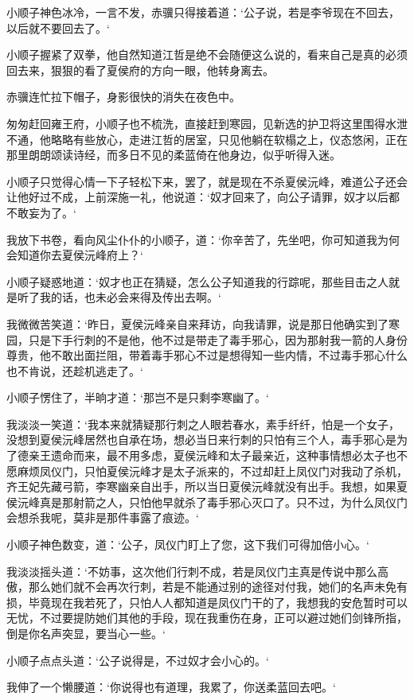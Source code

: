 小顺子神色冰冷，一言不发，赤骥只得接着道：‘公子说，若是李爷现在不回去，以后就不要回去了。‘

小顺子握紧了双拳，他自然知道江哲是绝不会随便这么说的，看来自己是真的必须回去来，狠狠的看了夏侯府的方向一眼，他转身离去。

赤骥连忙拉下帽子，身影很快的消失在夜色中。

匆匆赶回雍王府，小顺子也不梳洗，直接赶到寒园，见新选的护卫将这里围得水泄不通，他略略有些放心，走进江哲的居室，只见他躺在软榻之上，仪态悠闲，正在那里朗朗颂读诗经，而多日不见的柔蓝倚在他身边，似乎听得入迷。

小顺子只觉得心情一下子轻松下来，罢了，就是现在不杀夏侯沅峰，难道公子还会让他好过不成，上前深施一礼，他说道：‘奴才回来了，向公子请罪，奴才以后都不敢妄为了。‘

我放下书卷，看向风尘仆仆的小顺子，道：‘你辛苦了，先坐吧，你可知道我为何会知道你去夏侯沅峰府上？‘

小顺子疑惑地道：‘奴才也正在猜疑，怎么公子知道我的行踪呢，那些目击之人就是听了我的话，也未必会来得及传出去啊。‘

我微微苦笑道：‘昨日，夏侯沅峰亲自来拜访，向我请罪，说是那日他确实到了寒园，只是下手行刺的不是他，他不过是带走了毒手邪心，因为那射我一箭的人身份尊贵，他不敢出面拦阻，带着毒手邪心不过是想得知一些内情，不过毒手邪心什么也不肯说，还趁机逃走了。‘

小顺子愣住了，半晌才道：‘那岂不是只剩李寒幽了。‘

我淡淡一笑道：‘我本来就猜疑那行刺之人眼若春水，素手纤纤，怕是一个女子，没想到夏侯沅峰居然也自承在场，想必当日来行刺的只怕有三个人，毒手邪心是为了德亲王遗命而来，最不用多虑，夏侯沅峰和太子最亲近，这种事情想必太子也不愿麻烦凤仪门，只怕夏侯沅峰才是太子派来的，不过却赶上凤仪门对我动了杀机，齐王妃先藏弓箭，李寒幽亲自出手，所以当日夏侯沅峰就没有出手。我想，如果夏侯沅峰真是那射箭之人，只怕他早就杀了毒手邪心灭口了。只不过，为什么凤仪门会想杀我呢，莫非是那件事露了痕迹。‘

小顺子神色数变，道：‘公子，凤仪门盯上了您，这下我们可得加倍小心。‘

我淡淡摇头道：‘不妨事，这次他们行刺不成，若是凤仪门主真是传说中那么高傲，那么她们就不会再次行刺，若是不能通过别的途径对付我，她们的名声未免有损，毕竟现在我若死了，只怕人人都知道是凤仪门干的了，我想我的安危暂时可以无忧，不过要提防她们其他的手段，现在我重伤在身，正可以避过她们剑锋所指，倒是你名声突显，要当心一些。‘

小顺子点点头道：‘公子说得是，不过奴才会小心的。‘

我伸了一个懒腰道：‘你说得也有道理，我累了，你送柔蓝回去吧。‘

